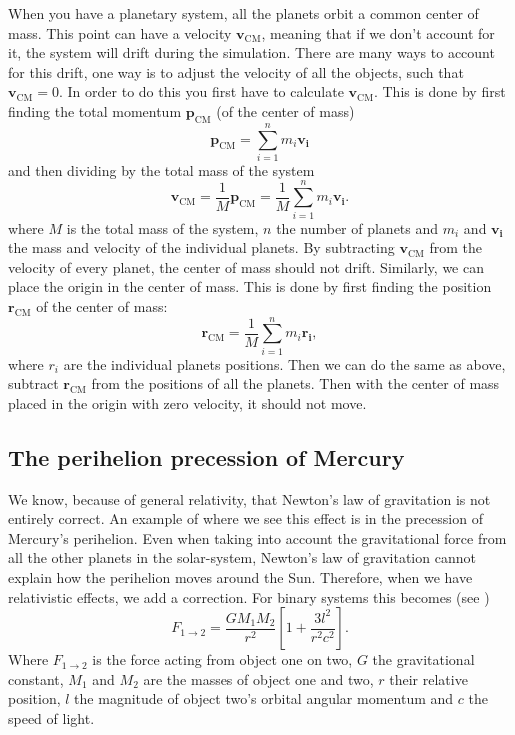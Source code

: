 \documentclass[reprint, english,notitlepage,nofootinbib]{revtex4-1}  %
\newcommand{\vc}[1]{\mathbf{#1}}
\begin{document}
When you have a planetary system, all the planets orbit a common center of mass. This point can have a velocity $\vc v_{\text{CM}}$, meaning that if we don't account for it, the system will drift during the simulation. There are many ways to account for this drift, one way is to adjust the velocity of all the objects, such that $\vc v_{\text{CM}} = 0$. In order to do this you first have to calculate $\vc v_{\text{CM}}$. This is done by first finding the total momentum $\mathbf{p}_{\text{CM}}$ (of the center of mass)
\begin{equation*}
	\mathbf{p}_{\text{CM}} = \sum_{i=1}^{n}m_i\mathbf{v_i}
\end{equation*}
and then dividing by the total mass of the system
\begin{equation}
	\label{eq:v_cm}
	\mathbf{v}_{\text{CM}} = \frac{1}{M}\mathbf{p}_{\text{CM}} =  \frac{1}{M}\sum_{i=1}^{n}m_i\mathbf{v_i}.
\end{equation}
where $M$ is the total mass of the system, $n$ the number of planets and $m_i$ and $\mathbf{v_i}$ the mass and velocity of the individual planets. By subtracting $\mathbf{v}_{\text{CM}}$ from the velocity of every planet, the center of mass should not drift. Similarly, we can place the origin in the center of mass. This is done by first finding the position $\mathbf{r}_{\text{CM}}$ of the center of mass:
\begin{equation}
	\label{eq:r_cm}
	\mathbf{r}_{\text{CM}} =  \frac{1}{M}\sum_{i=1}^{n}m_i\mathbf{r_i},
\end{equation}
where $r_i$ are the individual planets positions. Then we can do the same as above, subtract $\mathbf{r}_{\text{CM}}$ from the positions of all the planets. Then with the center of mass placed in the origin with zero velocity, it should not move.


\subsection{The perihelion precession of Mercury}

We know, because of general relativity, that Newton's law of gravitation is not entirely correct. An example of where we see this effect is in the precession of Mercury's perihelion. Even when taking into account the gravitational force from all the other planets in the solar-system, Newton's law of gravitation cannot explain how the perihelion moves around the Sun. Therefore, when we have relativistic effects, we add a correction. For binary systems this becomes (see \citep{oppgavetekst})
\begin{equation}
	\label{eq:general_relativity}
	F_{1 \rightarrow 2} = \frac{GM_1M_2}{r^2}\left[ 1 + \frac{3l^2}{r^2c^2} \right].
\end{equation}
Where $F_{1 \rightarrow 2}$ is the force acting from object one on two, $G$ the gravitational constant, $M_1$ and $M_2$ are the masses of object one and two, $r$ their relative position, $l$ the magnitude of object two's orbital angular momentum and $c$ the speed of light.
\end{document}
